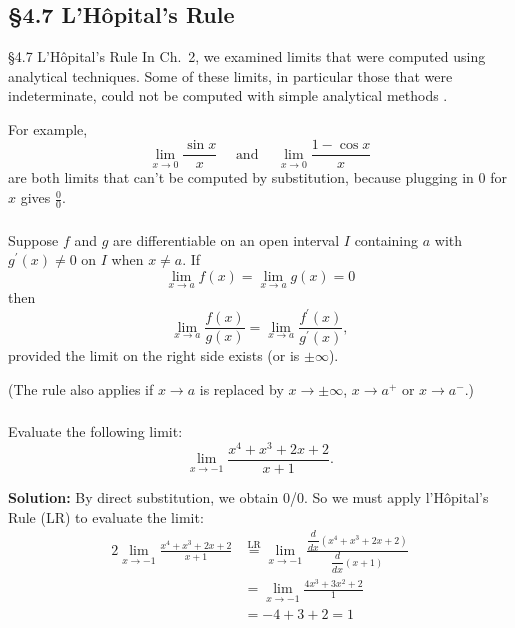 \documentclass[cal1spr16Lectures.tex]{subfiles}
\begin{document}
\section[]{}

\subsection[4.7 L'H\^opital's Rule]{\S 4.7 L'H\^{o}pital's Rule}

\begin{frame}{\S 4.7 L'H\^{o}pital's Rule}\small
In Ch.\ 2, we examined limits that were computed using analytical techniques.  Some of these limits, in particular those that were indeterminate, could not be computed with simple analytical methods%
.

\vspace{1pc}
For example, 
\vspace{-0.5pc}
\[\lim_{x \to 0} \frac{\sin x}{x}\quad\text{ and }\quad \lim_{x \to 0} \frac{1-\cos x}{x}\] 
are both limits that can't be computed by substitution, because plugging in 0 for $x$ gives $\frac{0}{0}$.
\end{frame}

\begin{frame}
\frametitle{}
\small
\begin{thm}
Suppose $f$ and $g$ are differentiable on an open interval $I$ containing $a$ with $g^{\prime}(x) \ne 0$ on $I$ when $x \ne a$.  If 
$$\lim_{x \to a} f(x)=\lim_{x \to a} g(x)=0$$
then
$$\lim_{x \to a} \frac{f(x)}{g(x)}=\lim_{x \to a} \frac{f^{\prime}(x)}{g^{\prime}(x)},$$
provided the limit on the right side exists (or is $\pm \infty$).
\end{thm}

\vspace{1pc}
(The rule also applies if $x \to a$ is replaced by $x \to \pm \infty$, $x \to a^+$ or $x \to a^-$.)
\end{frame}

\begin{frame}%
\frametitle{}
\small
\begin{ex} Evaluate the following limit:  
\vspace{-0.5pc}
\[\lim_{x \to -1} \frac{x^4+x^3+2x+2}{x+1}.\]
\end{ex}

\footnotesize
{\bf Solution:}  By direct substitution, we obtain 0/0.  So we must apply l'H\^{o}pital's Rule (LR) to evaluate the limit:
\begin{alignat*}{2}
\lim_{x \to -1} \frac{x^4+x^3+2x+2}{x+1} &\overset{\text{LR}}{=} \lim_{x \to -1} \frac{ \dfrac{d}{dx} \left(x^4+x^3+2x+2 \right)}{\dfrac{d}{dx} (x+1)} \\
&= \lim_{x \to -1} \frac{4x^3+3x^2+2}{1} \\
&= -4+3+2 = 1
\end{alignat*}
\end{frame}
\end{document}
